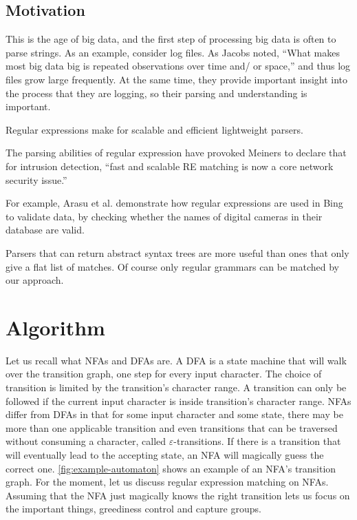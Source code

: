 \documentclass[11pt]{Thesis}
\theoremstyle{definition}
\newcommand{\seclabel}[1]{\label{sec:#1}}
\begin{document}
\section{Motivation}

This is the age of big data, and the first step of processing big
data is often to parse strings. As an example, consider log files.
As Jacobs\cite{Jaco09a}
noted, ``What makes most big data big is repeated observations over
time and/ or space,'' and thus log files grow large frequently. At
the same time, they provide important insight into the process that
they are logging, so their parsing and understanding is important. 

Regular expressions make for scalable and efficient lightweight parsers.\cite{Kart96a} 

The parsing abilities of regular expression have provoked Meiners to declare
that for intrusion detection, ``fast and scalable RE matching is
now a core network security issue.'' \cite{Mein10a}

For example, Arasu et al. \cite{Aras12a} demonstrate how regular
expressions are used in Bing to validate data, by checking whether
the names of digital cameras in their database are valid.

Parsers that can return abstract syntax trees are more useful than
ones that only give a flat list of matches. Of course only regular
grammars can be matched by our approach.

\chapter{Algorithm}
\seclabel{algo}

Let us recall what NFAs and DFAs are. A DFA is a state machine that
will walk over the transition graph, one step for every input
character. The choice of transition is limited by the transition's
character range. A transition can only be followed if the current
input character is inside transition's character range. NFAs differ
from DFAs in that for some input character and some state, there
may be more than one applicable transition and even transitions that can
be traversed without consuming a character, called $\varepsilon$-transitions.
If there is a transition that will eventually lead to the accepting
state, an NFA will magically guess the correct one. \autoref{fig:example-automaton}
shows an example of an NFA's transition graph. For the moment, let
us discuss regular expression matching on NFAs. Assuming that the
NFA just magically knows the right transition lets us focus on the
important things, greediness control and capture groups.
\end{document}
